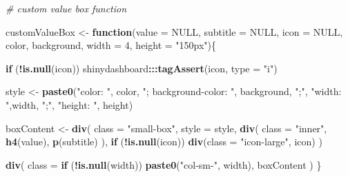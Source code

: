 \documentclass[
]{book}
\newenvironment{Shaded}{\begin{snugshade}}{\end{snugshade}}
\newcommand{\AttributeTok}[1]{\textcolor[rgb]{0.13,0.29,0.53}{#1}}
\newcommand{\CommentTok}[1]{\textcolor[rgb]{0.56,0.35,0.01}{\textit{#1}}}
\newcommand{\ConstantTok}[1]{\textcolor[rgb]{0.56,0.35,0.01}{#1}}
\newcommand{\ControlFlowTok}[1]{\textcolor[rgb]{0.13,0.29,0.53}{\textbf{#1}}}
\newcommand{\DecValTok}[1]{\textcolor[rgb]{0.00,0.00,0.81}{#1}}
\newcommand{\FunctionTok}[1]{\textcolor[rgb]{0.13,0.29,0.53}{\textbf{#1}}}
\newcommand{\NormalTok}[1]{#1}
\newcommand{\OtherTok}[1]{\textcolor[rgb]{0.56,0.35,0.01}{#1}}
\newcommand{\SpecialCharTok}[1]{\textcolor[rgb]{0.81,0.36,0.00}{\textbf{#1}}}
\newcommand{\StringTok}[1]{\textcolor[rgb]{0.31,0.60,0.02}{#1}}
\begin{document}
\begin{Shaded}
\begin{Highlighting}[]
\CommentTok{\# custom value box function }

\NormalTok{customValueBox }\OtherTok{\textless{}{-}} \ControlFlowTok{function}\NormalTok{(}\AttributeTok{value =} \ConstantTok{NULL}\NormalTok{, }\AttributeTok{subtitle =} \ConstantTok{NULL}\NormalTok{, }\AttributeTok{icon =} \ConstantTok{NULL}\NormalTok{, color, background, }
                           \AttributeTok{width =} \DecValTok{4}\NormalTok{, }\AttributeTok{height =} \StringTok{"150px"}\NormalTok{)\{}
  
  \ControlFlowTok{if}\NormalTok{ (}\SpecialCharTok{!}\FunctionTok{is.null}\NormalTok{(icon))}
\NormalTok{    shinydashboard}\SpecialCharTok{:::}\FunctionTok{tagAssert}\NormalTok{(icon, }\AttributeTok{type =} \StringTok{"i"}\NormalTok{)}
  
\NormalTok{  style }\OtherTok{\textless{}{-}} \FunctionTok{paste0}\NormalTok{(}\StringTok{"color: "}\NormalTok{, color, }\StringTok{"; background{-}color: "}\NormalTok{, background, }\StringTok{";"}\NormalTok{,}
                  \StringTok{"width: "}\NormalTok{,width,  }\StringTok{";"}\NormalTok{, }\StringTok{"height: "}\NormalTok{, height)}
  
\NormalTok{  boxContent }\OtherTok{\textless{}{-}} \FunctionTok{div}\NormalTok{(}
    \AttributeTok{class =} \StringTok{"small{-}box"}\NormalTok{, }\AttributeTok{style =}\NormalTok{ style,}
    \FunctionTok{div}\NormalTok{(}
      \AttributeTok{class =} \StringTok{"inner"}\NormalTok{,}
      \FunctionTok{h4}\NormalTok{(value),}
      \FunctionTok{p}\NormalTok{(subtitle)}
\NormalTok{    ),}
    \ControlFlowTok{if}\NormalTok{ (}\SpecialCharTok{!}\FunctionTok{is.null}\NormalTok{(icon)) }\FunctionTok{div}\NormalTok{(}\AttributeTok{class =} \StringTok{"icon{-}large"}\NormalTok{, icon)}
\NormalTok{  )}
  
  \FunctionTok{div}\NormalTok{(}
    \AttributeTok{class =} \ControlFlowTok{if}\NormalTok{ (}\SpecialCharTok{!}\FunctionTok{is.null}\NormalTok{(width)) }\FunctionTok{paste0}\NormalTok{(}\StringTok{"col{-}sm{-}"}\NormalTok{, width), }
\NormalTok{    boxContent}
\NormalTok{  )}
\NormalTok{\}}
\end{Highlighting}
\end{Shaded}
\end{document}
